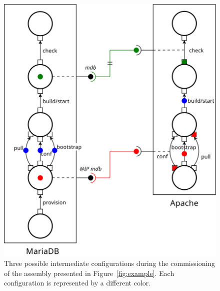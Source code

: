 \begin{figure}[tbp]
  \begin{center}
    \includegraphics[width=0.7\linewidth]{./images/scenari.pdf}
  \end{center}
  \caption{Three possible intermediate configurations during the commissioning
  of the assembly presented in Figure~\ref{fig:example}. Each configuration is
  represented by a different color.}
  \label{fig:scenari}
\end{figure}

